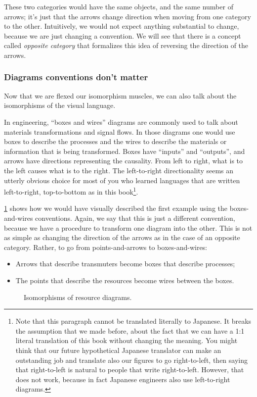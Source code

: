 These two categories would have the same objects, and the same number of arrows; it's just 
that the arrows change direction when moving from one category to the other. 
Intuitively, we would not expect anything substantial to change, because we are 
just changing a convention. We will see that there is a concept called \emph{opposite category}
that formalizes this idea of reversing the direction of the arrows. 

\subsubsection{Diagrams  conventions don't matter}

Now that we are flexed our isomorphism muscles, we can also talk about the isomorphisms 
of the visual language. 

In engineering, ``boxes and wires'' diagrams are commonly used to talk about 
materials transformations and signal flows. In those diagrams one would use 
boxes to describe the processes and the wires to describe the materials or information
that is being transformed. Boxes have ``inputs'' and ``outputs'', and arrows have 
directions representing the causality. From left to right, what is to the left causes what is to the right.
The left-to-right directionality seems an utterly obvious choice for most of you 
who learned languages that are written left-to-right, top-to-bottom as in this book\footnote{
Note that this paragraph cannot be translated literally to Japanese. It breaks the assumption
that we made before, about the fact that we can have a 1:1 literal translation of this book
without changing the meaning. You might think that our future hypothetical Japanese
translator can make an outstanding job and translate also our figures to go right-to-left,
then saying that right-to-left is natural to people that write right-to-left. However,
that does not work, because in fact Japanese engineers also use left-to-right diagrams.}.

\cref{fig:isodiagrams} shows how we would have visually described
the first example using the boxes-and-wires conventions. 
Again, we say that this is just a different convention, because
we have a procedure to transform one diagram into the other. 
This is not as simple as changing the direction of the arrows as in the case of an 
opposite category. Rather, to go from points-and-arrows to boxes-and-wires:
\begin{itemize}
    \item Arrows that describe transmuters become boxes that describe processes;
    \item The points that describe the resources become wires between the boxes.
\end{itemize}


\begin{figure}[h!]
    \centering
    
    \caption{Isomorphisms of resource diagrams. \label{fig:isodiagrams} }
\end{figure}


